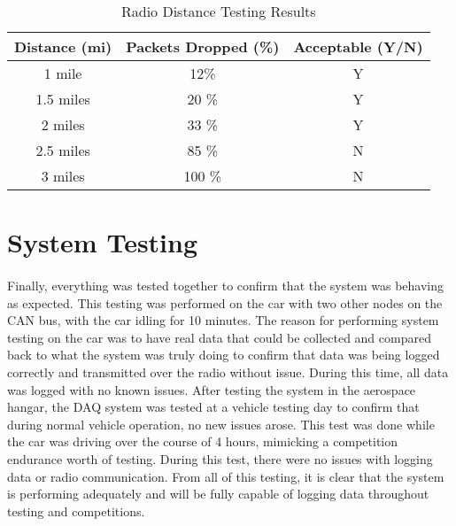 \begin{table}[H] \label{table:RadioDistance}
\caption{Radio Distance Testing Results}
\centering
\begin{tabular}{c c c}
\hline\hline
Distance (mi) & Packets Dropped (\%) & Acceptable (Y/N) \\ [0.5ex]
\hline
1 mile & 12\% & Y \\
1.5 miles & 20 \% & Y \\
2 miles & 33 \% & Y \\
2.5 miles & 85 \% & N \\
3 miles & 100 \% & N \\ [1ex]
\hline
\end{tabular}
\end{table}

\section{System Testing}

\paragraph{}
Finally, everything was tested together to confirm that the system was behaving as expected.
This testing was performed on the car with two other nodes on the CAN bus, with the car idling for 10 minutes.
The reason for performing system testing on the car was to have real data that could be collected and compared back to what the system was truly doing to confirm that data was being logged correctly and transmitted over the radio without issue.
During this time, all data was logged with no known issues.
After testing the system in the aerospace hangar, the DAQ system was tested at a vehicle testing day to confirm that during normal vehicle operation, no new issues arose.
This test was done while the car was driving over the course of 4 hours, mimicking a competition endurance worth of testing.
During this test, there were no issues with logging data or radio communication.
From all of this testing, it is clear that the system is performing adequately and will be fully capable of logging data throughout testing and competitions.

